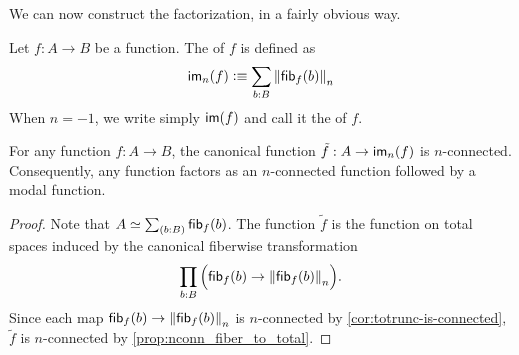 

We can now construct the factorization, in a fairly obvious way.

\begin{defn}\label{defn:modal-image}
Let $f:A\to B$ be a function. The 
%
%
%
%
of $f$ is defined as
\begin{equation*}
\im_n(f)\defeq \sm{b:B} \trunc n{\hfib{f}b}
\end{equation*}
When $n=-1$, we write simply $\im(f)$ and call it the  of $f$.
\end{defn}

\begin{lem}\label{prop:to_image_is_connected}
For any function $f:A\to B$, the canonical function $\tilde{f}:A\to\im_n(f)$ is $n$-connected. 
Consequently, any function factors as an $n$-connected function followed by a modal function.
\end{lem}

\begin{proof}
Note that $A\eqvsym\sm{b:B}\hfib{f}b$. The function $\tilde{f}$ is the function on total spaces induced by the canonical fiberwise transformation
\begin{equation*}
\prd{b:B} \Parens{\hfib{f}b\to\trunc n{\hfib{f}b}}.
\end{equation*}
Since each map $\hfib{f}b\to\trunc n{\hfib{f}b}$ is $n$-connected by \autoref{cor:totrunc-is-connected}, $\tilde{f}$ is $n$-connected by \autoref{prop:nconn_fiber_to_total}.
\end{proof}

